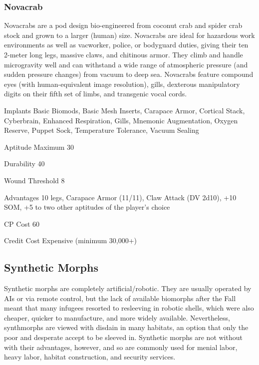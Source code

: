 \subsubsection{Novacrab}
\label{sec:starting-novacrab}

Novacrabs are a pod design bio-engineered from coconut crab and spider crab stock and grown to a larger (human) size. Novacrabs are ideal for hazardous work environments as well as vacworker, police, or bodyguard duties, giving their ten 2-meter long legs, massive claws, and chitinous armor. They climb and handle microgravity well and can withstand a wide range of atmospheric pressure (and sudden pressure changes) from vacuum to deep sea. Novacrabs feature compound eyes (with human-equivalent image resolution), gills, dexterous manipulatory digits on their fifth set of limbs, and transgenic vocal cords.

\begin{description*}
\item[Implants] Basic Biomods, Basic Mesh Inserts, Carapace Armor, Cortical Stack, Cyberbrain, Enhanced Respiration, Gills, Mnemonic Augmentation, Oxygen Reserve, Puppet Sock, Temperature Tolerance, Vacuum Sealing
\item[Aptitude Maximum] 30 
\item[Durability] 40 
\item[Wound Threshold] 8 
\item[Advantages] 10 legs, Carapace Armor (11/11), Claw Attack (DV 2d10), +10 SOM, +5 to two other aptitudes of the player’s choice
\item[CP Cost] 60 
\item[Credit Cost] Expensive (minimum 30,000+) 
\end{description*}

\subsection{Synthetic Morphs}
\label{sec:starting-syntheticmorphs}

Synthetic morphs are completely artificial/robotic. They are usually operated by AIs or via remote control, but the lack of available biomorphs after the Fall meant that many infugees resorted to resleeving in robotic shells, which were also cheaper, quicker to manufacture, and more widely available. Nevertheless, synthmorphs are viewed with disdain in many habitats, an option that only the poor and desperate accept to be sleeved in. Synthetic morphs are not without with their advantages, however, and so are commonly used for menial labor, heavy labor, habitat construction, and security services.

